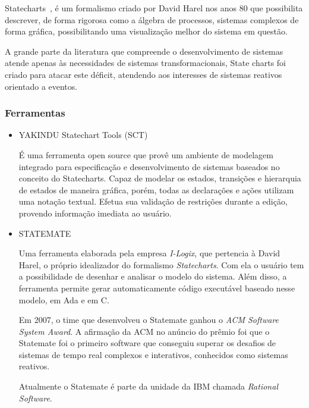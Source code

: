 Statecharts~\cite{Harel:1987:SVF:34884.34886}, é um formalismo criado por
David Harel nos anos 80 que possibilita descrever, de forma rigorosa como a
álgebra de processos, sistemas complexos de forma gráfica, possibilitando uma
visualização melhor do sistema em questão.

A grande parte da literatura que compreende o desenvolvimento de sistemas atende
apenas às necessidades de sistemas transformacionais, State charts foi criado para
atacar este déficit, atendendo aos interesses de sistemas reativos orientado a eventos.

\subsubsection{Ferramentas}
\begin{itemize}

\item{YAKINDU Statechart Tools (SCT)}

É uma ferramenta open source que provê um ambiente de modelagem integrado para especificação e
desenvolvimento de sistemas baseados no conceito do Statecharts. Capaz de modelar os estados, transições
e hierarquia de estados de maneira gráfica, porém, todas as declarações e ações utilizam uma notação
textual. Efetua sua validação de restrições durante a edição, provendo informação imediata ao usuário.


\item{STATEMATE}

Uma ferramenta elaborada pela empresa \textit{I-Logix}, que pertencia à David Harel, o próprio
idealizador do formalismo \textit{Statecharts}. Com ela o usuário tem a possibilidade de desenhar
e analisar o modelo do sistema. Além disso, a ferramenta permite gerar automaticamente
código executável baseado nesse modelo, em Ada e em C.

Em 2007, o time que desenvolveu o Statemate ganhou o \textit{ACM Software System Award}. A afirmação
da ACM no anúncio do prêmio foi que o Statemate foi o primeiro software que conseguiu superar os
desafios de sistemas de tempo real complexos e interativos, conhecidos como sistemas reativos.

Atualmente o Statemate é parte da unidade da IBM chamada \textit{Rational Software}.

\end{itemize}
